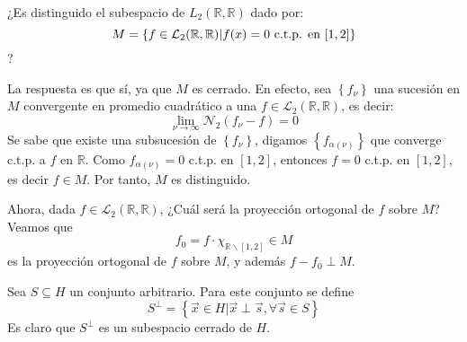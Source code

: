 \documentclass[12pt]{report}
\theoremstyle{largebreak}
\begin{document}
    \begin{exa}
        ¿Es distinguido el subespacio de $L_2(\mathbb{R},\mathbb{R})$ dado por:
        \begin{equation*}
            M=\left\{f\in\mathcal{L}_2(\mathbb{R},\mathbb{R})| f(x)=0\textup{ c.t.p. en }[1,2] \right\}
        \end{equation*}
        ?
        
        La respuesta es que sí, ya que $M$ es cerrado. En efecto, sea $\left\{f_\nu\right\}$ una sucesión en $M$ convergente en promedio cuadrático a una $f\in\mathcal{L}_2(\mathbb{R},\mathbb{R})$, es decir:
        \begin{equation*}
            \lim_{\nu\rightarrow\infty}\mathcal{N}_2(f_\nu-f)=0
        \end{equation*}
        Se sabe que existe una subsucesión de $\left\{f_\nu\right\}$, digamos $\left\{f_{\alpha(\nu)}\right\}$ que converge c.t.p. a $f$ en $\mathbb{R}$. Como $f_{\alpha(\nu)}=0$ c.t.p. en $[1,2]$, entonces $f=0$ c.t.p. en $[1,2]$, es decir $f\in M$. Por tanto, $M$ es distinguido.

        Ahora, dada $f\in\mathcal{L}_2(\mathbb{R},\mathbb{R})$, ¿Cuál será la proyección ortogonal de $f$ sobre $M$? Veamos que
        \begin{equation*}
            f_0=f\cdot\chi_{\mathbb{R}\backslash[1,2]}\in M
        \end{equation*}
        es la proyección ortogonal de $f$ sobre $M$, y además $f-f_0\perp M$.
    \end{exa}

    \begin{mydef}
        Sea $S\subseteq H$ un conjunto arbitrario. Para este conjunto se define
        \begin{equation*}
            S^{\perp}=\left\{\vec{x}\in H|\vec{x}\perp\vec{s},\forall\vec{s}\in S \right\}
        \end{equation*}
        Es claro que $S^\perp$ es un subespacio cerrado de $H$.
    \end{mydef}
\end{document}
